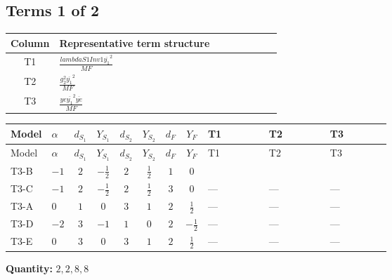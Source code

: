 \documentclass[8pt]{article}
\begin{document}
\begin{landscape}
\subsection*{Terms 1 of 2}
\begin{center}
\begin{tabular}{@{}c >{\raggedright\arraybackslash}p{0.82\linewidth}@{}}
\toprule
Column & Representative term structure \\
\midrule
T1 & \(\displaystyle \frac{lambdaS1Inv1 \overline{y_{1}}^{2}}{MF}\) \\
\midrule
T2 & \(\displaystyle \frac{g_{2}^{2} \overline{y_{1}}^{2}}{MF}\) \\
\midrule
T3 & \(\displaystyle \frac{ye \overline{y_{1}}^{2} \overline{ye}}{MF}\) \\
\midrule
\bottomrule
\end{tabular}
\end{center}
\smallskip
\tiny
\begin{longtable}{@{}llcccccc >{\raggedright\arraybackslash}p{0.21\linewidth} >{\raggedright\arraybackslash}p{0.21\linewidth} >{\raggedright\arraybackslash}p{0.21\linewidth}@{}}
\toprule
Model & $\alpha$ & $d_{S_1}$ & $Y_{S_1}$ & $d_{S_2}$ & $Y_{S_2}$ & $d_F$ & $Y_F$ & T1 & T2 & T3 \\
\midrule
\endfirsthead
\toprule
Model & $\alpha$ & $d_{S_1}$ & $Y_{S_1}$ & $d_{S_2}$ & $Y_{S_2}$ & $d_F$ & $Y_F$ & T1 & T2 & T3 \\
\midrule
\endhead
T3-B & $-1$ & $2$ & $-\frac{1}{2}$ & $2$ & $\frac{1}{2}$ & $1$ & $0$ & \scriptsize\adjustbox{max width=\linewidth}{$\begin{gathered} \frac{lambdaS1Inv1 \overline{y_{1}}^{2}}{2 MF}\end{gathered}$} & \scriptsize\adjustbox{max width=\linewidth}{$\begin{gathered} \frac{3 g_{2}^{2} \overline{y_{1}}^{2}}{4 MF}\end{gathered}$} & \scriptsize\adjustbox{max width=\linewidth}{$\begin{gathered} - \frac{ye \overline{y_{1}}^{2} \overline{ye}}{4 MF}\end{gathered}$} \\
\midrule
T3-C & $-1$ & $2$ & $-\frac{1}{2}$ & $2$ & $\frac{1}{2}$ & $3$ & $0$ & --- & --- & --- \\
\midrule
T3-A & $0$ & $1$ & $0$ & $3$ & $1$ & $2$ & $\frac{1}{2}$ & --- & --- & --- \\
\midrule
T3-D & $-2$ & $3$ & $-1$ & $1$ & $0$ & $2$ & $-\frac{1}{2}$ & --- & --- & --- \\
\midrule
T3-E & $0$ & $3$ & $0$ & $3$ & $1$ & $2$ & $\frac{1}{2}$ & --- & --- & --- \\
\midrule
\bottomrule
\end{longtable}
\clearpage
\noindent\textbf{Quantity: }$\mathrm{2,2,8,8}$\par\smallskip

\end{landscape}
\end{document}
